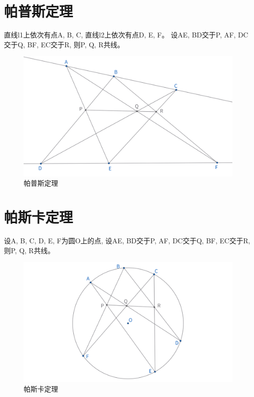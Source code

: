 \section{帕普斯定理}
\begin{theorem}
直线l1上依次有点A, B, C, 直线l2上依次有点D, E, F。
设AE, BD交于P, AF, DC交于Q, BF, EC交于R, 则P, Q, R共线。
\end{theorem}
\begin{figure}[H]
    \centering
    \includegraphics[width=\linewidth]{figures/帕普斯定理.png}
    \caption{帕普斯定理}
\end{figure}


\newpage
\section{帕斯卡定理}
\begin{theorem}
设A, B, C, D, E, F为圆O上的点, 设AE, BD交于P, AF, DC交于Q, BF, EC交于R, 则P, Q, R共线。
\end{theorem}
\begin{figure}[H]
    \centering
    \includegraphics[width=\linewidth]{figures/帕斯卡定理.png}
    \caption{帕斯卡定理}
\end{figure}


